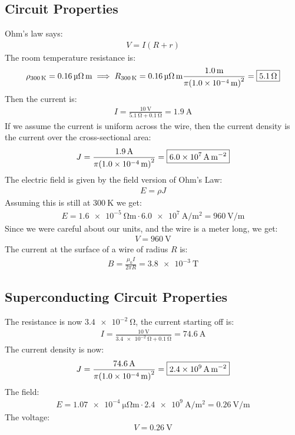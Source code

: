 \documentclass[12pt]{article}
\begin{document}
\subsection{Circuit Properties}
Ohm's law says:
\begin{align*}
  V=I(R+r)
\end{align*}
The room temperature resistance is:
\begin{align*}
  \rho_{\SI{300}{K}}=\SI{0.16}{\micro\ohm\meter}\implies
  R_{\SI{300}{\K}}=\SI{0.16}{\micro\ohm\meter}
  \frac{\SI{1.0}{\m}}{\pi\qty(\SI{1.0e-4}{\m})^2}=\boxed{\SI{5.1}{\ohm}}
\end{align*}
Then the current is:
\begin{align*}
  I=\frac{\SI{10}{\V}}{\SI{5.1}{\ohm}+\SI{0.1}{\ohm}}=\boxed{\SI{1.9}{\A}}
\end{align*}
If we assume the current is uniform across the wire, then the current density is the current over the cross-sectional area:
\begin{align*}
  J=\frac{\SI{1.9}{\A}}{\pi\qty(\SI{1.0e-4}{\m})^2}=
  \boxed{\SI{6.0e7}{\A\per\square\m}}
\end{align*}
The electric field is given by the field version of Ohm's Law:
\begin{align*}
  E=\rho J
\end{align*}
Assuming this is still at $\SI{300}{\K}$ we get:
\begin{align*}
  E=\SI{1.6e-5}{\ohm\meter}\cdot\SI{6.0e7}{\A\per\square\meter}=
  \boxed{\SI{960}{\V\per\m}}
\end{align*}
Since we were careful about our units, and the wire is a meter long, we get:
\begin{align*}
  \boxed{V=\SI{960}{\V}}
\end{align*}
The current at the surface of a wire of radius $R$ is:
\begin{align*}
  B=\frac{\mu_0I}{2\pi R}=\boxed{\SI{3.8e-3}{\tesla}}
\end{align*}
\subsection{Superconducting Circuit Properties}
The resistance is now $\SI{3.4e-2}{\ohm}$, the current starting off is:
\begin{align*}
  I=\frac{\SI{10}{\V}}{\SI{3.4e-2}{\ohm}+\SI{0.1}{\ohm}}=\boxed{\SI{74.6}{\A}}
\end{align*}
The current density is now:
\begin{align*}
  J=\frac{\SI{74.6}{\A}}{\pi\qty(\SI{1.0e-4}{\m})^2}=
  \boxed{\SI{2.4e9}{\A\per\square\m}}
\end{align*}
The field:
\begin{align*}
  E=\SI{1.07e-4}{\micro\ohm\meter}\cdot\SI{2.4e9}{\A\per\square\meter}=
  \boxed{\SI{0.26}{\V\per\m}}
\end{align*}
The voltage:
\begin{align*}
  \boxed{V=\SI{0.26}{\V}}
\end{align*}
\end{document}
